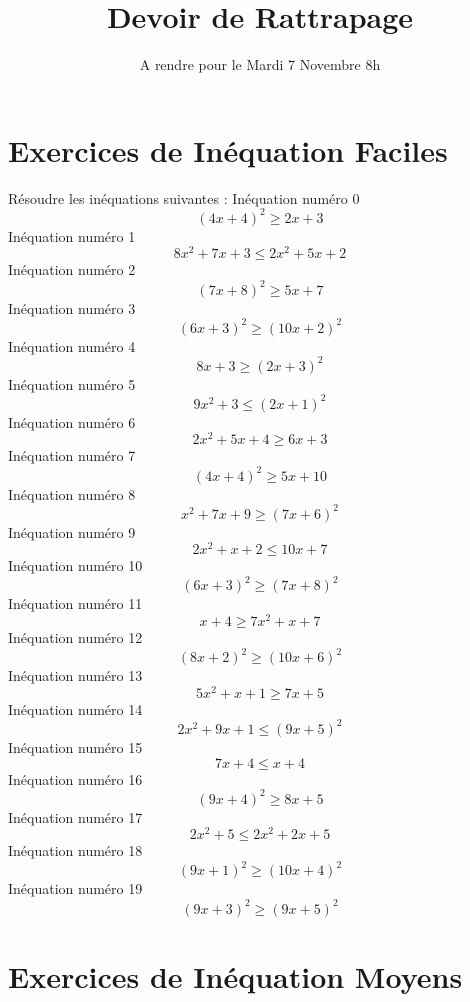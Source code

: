 \documentclass{article}
\title{Devoir de Rattrapage}
\date{A rendre pour le Mardi 7 Novembre 8h}\usepackage{natbib}
\begin{document}
\maketitle
 \section{Exercices de In\'equation Faciles}

 R\'esoudre les in\'equations suivantes : 
In\'equation num\'ero 0 \[\left(4 x + 4\right)^{2} \geq 2 x + 3\]In\'equation num\'ero 1 \[8 x^{2} + 7 x + 3 \leq 2 x^{2} + 5 x + 2\]In\'equation num\'ero 2 \[\left(7 x + 8\right)^{2} \geq 5 x + 7\]In\'equation num\'ero 3 \[\left(6 x + 3\right)^{2} \geq \left(10 x + 2\right)^{2}\]In\'equation num\'ero 4 \[8 x + 3 \geq \left(2 x + 3\right)^{2}\]In\'equation num\'ero 5 \[9 x^{2} + 3 \leq \left(2 x + 1\right)^{2}\]In\'equation num\'ero 6 \[2 x^{2} + 5 x + 4 \geq 6 x + 3\]In\'equation num\'ero 7 \[\left(4 x + 4\right)^{2} \geq 5 x + 10\]In\'equation num\'ero 8 \[x^{2} + 7 x + 9 \geq \left(7 x + 6\right)^{2}\]In\'equation num\'ero 9 \[2 x^{2} + x + 2 \leq 10 x + 7\]In\'equation num\'ero 10 \[\left(6 x + 3\right)^{2} \geq \left(7 x + 8\right)^{2}\]In\'equation num\'ero 11 \[x + 4 \geq 7 x^{2} + x + 7\]In\'equation num\'ero 12 \[\left(8 x + 2\right)^{2} \geq \left(10 x + 6\right)^{2}\]In\'equation num\'ero 13 \[5 x^{2} + x + 1 \geq 7 x + 5\]In\'equation num\'ero 14 \[2 x^{2} + 9 x + 1 \leq \left(9 x + 5\right)^{2}\]In\'equation num\'ero 15 \[7 x + 4 \leq x + 4\]In\'equation num\'ero 16 \[\left(9 x + 4\right)^{2} \geq 8 x + 5\]In\'equation num\'ero 17 \[2 x^{2} + 5 \leq 2 x^{2} + 2 x + 5\]In\'equation num\'ero 18 \[\left(9 x + 1\right)^{2} \geq \left(10 x + 4\right)^{2}\]In\'equation num\'ero 19 \[\left(9 x + 3\right)^{2} \geq \left(9 x + 5\right)^{2}\]
 \section{Exercices de In\'equation Moyens}
\end{document}
